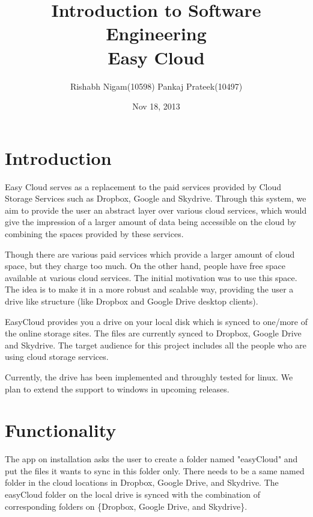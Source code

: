 \documentclass{article}
\title{Introduction to Software Engineering \\ Easy Cloud}
\author{Rishabh Nigam(10598)  Pankaj Prateek(10497)}
\date{Nov 18, 2013}
\begin{document}
\maketitle

\section{Introduction}
Easy Cloud serves as a replacement to the paid services provided by Cloud Storage Services such as Dropbox, Google and Skydrive. Through this system, we aim to provide the user an abstract layer over various cloud services, which would give the impression of a larger amount of data being accessible on the cloud by combining the spaces provided by these services.

Though there are various paid services which provide a larger amount of cloud space,  but they charge too much. On the other hand, people have free space available at various cloud services. The initial motivation was to use this space. The idea is to make it in a more robust and scalable way, providing the user a drive like structure (like Dropbox and Google Drive desktop clients). 

EasyCloud provides you a drive on your local disk which is synced to one/more of the online storage sites. The files are currently synced to Dropbox, Google Drive and Skydrive.  The target audience for this project includes all the people who are using cloud storage services.

Currently, the drive has been implemented and throughly tested for linux. We plan to extend the support to windows in upcoming releases.

\section{Functionality}
The app on installation asks the user to create a folder named "easyCloud" and put the files it wants to sync in this folder only. There needs to be a same named folder in the cloud locations in Dropbox, Google Drive, and Skydrive. The easyCloud folder on the local drive is synced with the combination of corresponding folders on \{Dropbox, Google Drive, and Skydrive\}.
\end{document}
